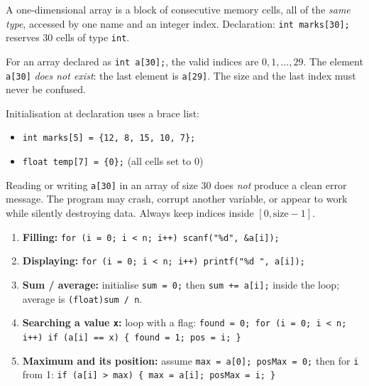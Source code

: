 \documentclass[11pt]{article}
\newcommand{\cle}[1]{{\popxbold\color{popdark}#1}}
\newcounter{popsec}
\newcounter{popsub}
\newcommand{\courssub}[1]{%
  \stepcounter{popsub}%
  \par\vspace{9pt}\noindent{\popxbold\fontsize{11.5}{13}\selectfont\color{popink}{\color{poporange}\thepopsec.\thepopsub}\hspace{6pt}#1}\par\nopagebreak\vspace{4pt}
}
\begin{document}
\courssub{One-dimensional arrays}

\begin{definition}[1D array]
A \cle{one-dimensional array} is a block of consecutive memory cells, all of the \emph{same type}, accessed by one name and an integer \cle{index}. Declaration: \texttt{int marks[30];} reserves 30 cells of type \texttt{int}.
\end{definition}

\begin{propriete}
For an array declared as \texttt{int a[30];}, the valid indices are $0, 1, \dots, 29$. The element \texttt{a[30]} \emph{does not exist}: the last element is \texttt{a[29]}. The size and the last index must never be confused.
\end{propriete}

Initialisation at declaration uses a brace list:
\begin{itemize}
\item \texttt{int marks[5] = \{12, 8, 15, 10, 7\};}
\item \texttt{float temp[7] = \{0\};} \quad (all cells set to 0)
\end{itemize}

\begin{attention}
Reading or writing \texttt{a[30]} in an array of size 30 does \emph{not} produce a clean error message. The program may crash, corrupt another variable, or appear to work while silently destroying data. Always keep indices inside $[0, \text{size}-1]$.
\end{attention}

\begin{methode}
\begin{enumerate}
\item \textbf{Filling:} \texttt{for (i = 0; i < n; i++) scanf("\%d", \&a[i]);}
\item \textbf{Displaying:} \texttt{for (i = 0; i < n; i++) printf("\%d ", a[i]);}
\item \textbf{Sum / average:} initialise \texttt{sum = 0;} then \texttt{sum += a[i];} inside the loop; average is \texttt{(float)sum / n}.
\item \textbf{Searching a value \texttt{x}:} loop with a flag: \texttt{found = 0; for (i = 0; i < n; i++) if (a[i] == x) \{ found = 1; pos = i; \}}
\item \textbf{Maximum and its position:} assume \texttt{max = a[0]; posMax = 0;} then for \texttt{i} from 1: \texttt{if (a[i] > max) \{ max = a[i]; posMax = i; \}}
\end{enumerate}
\end{methode}
\end{document}
